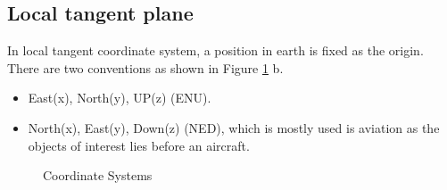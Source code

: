 \subsection{Local tangent plane}

In local tangent coordinate system, a position in earth is fixed as the origin. There are two conventions as shown in Figure \ref{fig:coordinatesystem} b.

\begin{itemize}
	\item East(x), North(y), UP(z) (ENU).
	\item North(x), East(y), Down(z) (NED), which is mostly used is aviation as the objects of interest lies before an aircraft.
\end{itemize}

\begin{figure}%
	\centering
	\caption[ECEF coordinate system]{\small Coordinate Systems
	}%
	\label{fig:coordinatesystem}%
\end{figure}

